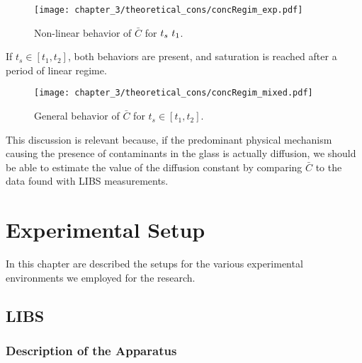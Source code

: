 \begin{figure}[H]
   \centering
   \texttt{[image: chapter\_3/theoretical\_cons/concRegim\_exp.pdf]} 
    \vspace*{-30pt}
   \caption{Non-linear behavior of $\bar{C}$ for $\protect t_s ~ t_1$.}
   \label{fig:c_bar_non_linear}
\end{figure}
If $t_s \in [t_1, t_2]$, both behaviors are present, and saturation is reached after a period of linear regime.
\begin{figure}[H]
    \centering
    \texttt{[image: chapter\_3/theoretical\_cons/concRegim\_mixed.pdf]} 
     \vspace*{-30pt}
    \caption{General behavior of $\bar{C}$ for  $t_s \in [t_1, t_2]$.}
    \label{fig:c_bar_mixed}
 \end{figure}
This discussion is relevant because, if the predominant physical mechanism causing the presence of contaminants in the glass is actually diffusion, we should be able to estimate the value of the diffusion constant by comparing $\bar{C}$ to the data found with LIBS measurements.

\chapter{Experimental Setup}
\label{ch:experimental_setup}
In this chapter are described the setups for the various experimental environments we employed for the research.


\section{LIBS}
\label{sec:LIBS_apparatus}

\subsection{Description of the Apparatus}
\label{sec:Description_of_the_apparatus}

